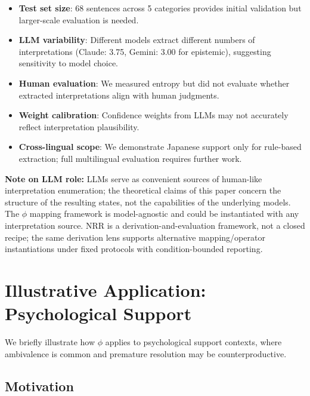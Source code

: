 \documentclass[11pt,a4paper]{article}
\begin{document}
\begin{itemize}
    \item \textbf{Test set size}: 68 sentences across 5 categories provides 
          initial validation but larger-scale evaluation is needed.
    \item \textbf{LLM variability}: Different models extract different numbers 
          of interpretations (Claude: 3.75, Gemini: 3.00 for epistemic), suggesting 
          sensitivity to model choice.
    \item \textbf{Human evaluation}: We measured entropy but did not evaluate 
          whether extracted interpretations align with human judgments.
    \item \textbf{Weight calibration}: Confidence weights from LLMs may not 
          accurately reflect interpretation plausibility.
    \item \textbf{Cross-lingual scope}: We demonstrate Japanese support only for 
          rule-based extraction; full multilingual evaluation requires further work.
\end{itemize}

\noindent\textbf{Note on LLM role:} LLMs serve as convenient sources of human-like interpretation enumeration; the theoretical claims of this paper concern the structure of the resulting states, not the capabilities of the underlying models. The $\phi$ mapping framework is model-agnostic and could be instantiated with any interpretation source.
NRR is a derivation-and-evaluation framework, not a closed recipe; the same derivation lens supports alternative mapping/operator instantiations under fixed protocols with condition-bounded reporting.

\section{Illustrative Application: Psychological Support}
\label{sec:application}

We briefly illustrate how $\phi$ applies to psychological support contexts, 
where ambivalence is common and premature resolution may be counterproductive.

\subsection{Motivation}
\end{document}
